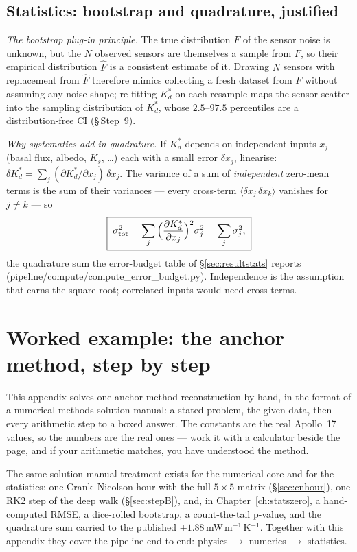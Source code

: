 \documentclass[11pt]{report}
\newcommand{\code}[1]{{\ttfamily\small #1}}
\begin{document}
\section{Statistics: bootstrap and quadrature, justified}\label{app:stats}
\emph{The bootstrap plug-in principle.} The true distribution $F$ of the
sensor noise is unknown, but the $N$ observed sensors are themselves a sample from
$F$, so their empirical distribution $\widehat F$ is a consistent estimate of it.
Drawing $N$ sensors with replacement from $\widehat F$ therefore mimics
collecting a fresh dataset from $F$ without assuming any noise shape; re-fitting
$K_d^{*}$ on each resample maps the sensor scatter into the sampling distribution
of $K_d^{*}$, whose $2.5$--$97.5$ percentiles are a distribution-free CI
(\S\,Step~9).

\emph{Why systematics add in quadrature.} If $K_d^{*}$ depends on independent
inputs $x_j$ (basal flux, albedo, $K_s$, \ldots) each with a small error
$\delta x_j$, linearise: $\delta K_d^{*}=\sum_j(\partial K_d^{*}/\partial x_j)\,
\delta x_j$. The variance of a sum of \emph{independent} zero-mean terms is the
sum of their variances --- every cross-term $\langle\delta x_j\,\delta
x_k\rangle$ vanishes for $j\neq k$ --- so
\[
\boxed{\;\sigma_{\rm tot}^2=\sum_j\Big(\frac{\partial K_d^{*}}{\partial x_j}\Big)^2
\sigma_j^2=\sum_j\sigma_j^2,\;}
\]
the quadrature sum the error-budget table of \S\ref{sec:resultstats} reports
(\code{pipeline/compute/compute\_error\_budget.py}). Independence is the
assumption that earns the square-root; correlated inputs would need cross-terms.

\chapter{Worked example: the anchor method, step by step}\label{app:worked}

\begin{plain}
This appendix solves one anchor-method reconstruction by hand, in the format of a
numerical-methods solution manual: a stated problem, the given data, then every
arithmetic step to a boxed answer. The constants are the real Apollo~17 values, so
the numbers are the real ones --- work it with a calculator beside the page, and if
your arithmetic matches, you have understood the method.
\end{plain}

\noindent The same solution-manual treatment exists for the numerical core and
for the statistics: one Crank--Nicolson hour with the full $5\times5$ matrix
(\S\ref{sec:cnhour}), one RK2 step of the deep walk (\S\ref{sec:stepB}), and,
in Chapter~\ref{ch:statszero}, a hand-computed RMSE, a dice-rolled bootstrap,
a count-the-tail p-value, and the quadrature sum carried to the published
$\pm1.88$\,mW\,m$^{-1}$\,K$^{-1}$. Together with this appendix they cover the
pipeline end to end: physics $\rightarrow$ numerics $\rightarrow$ statistics.
\end{document}
